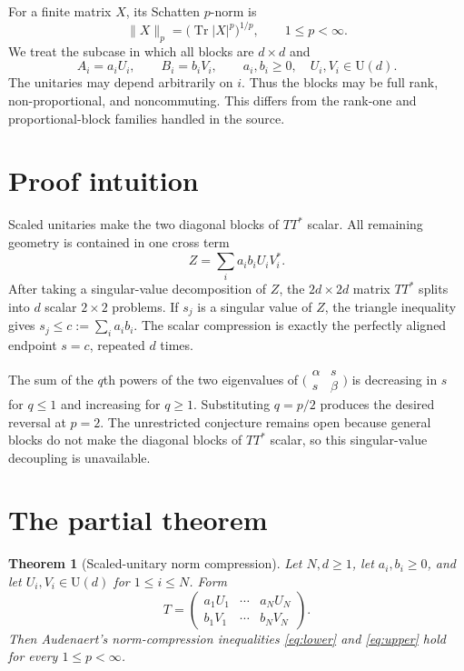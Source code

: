 \documentclass[11pt]{article}
\newtheorem{theorem}{Theorem}
\newcommand{\Tr}{\operatorname{Tr}}
\begin{document}
For a finite matrix $X$, its Schatten $p$-norm is
\[
 \lVert X\rVert_p=\bigl(\Tr |X|^p\bigr)^{1/p},\qquad 1\leq p<\infty.
\]
We treat the subcase in which all blocks are $d\times d$ and
\[
 A_i=a_iU_i,\qquad B_i=b_iV_i,
 \qquad a_i,b_i\geq0,\quad U_i,V_i\in\mathrm U(d).
\]
The unitaries may depend arbitrarily on $i$.  Thus the blocks may be full
rank, non-proportional, and noncommuting.  This differs from the rank-one and
proportional-block families handled in the source.

\section{Proof intuition}

Scaled unitaries make the two diagonal blocks of $TT^*$ scalar.  All remaining
geometry is contained in one cross term
\[
 Z=\sum_i a_ib_iU_iV_i^*.
\]
After taking a singular-value decomposition of $Z$, the $2d\times2d$ matrix
$TT^*$ splits into $d$ scalar $2\times2$ problems.  If $s_j$ is a singular
value of $Z$, the triangle inequality gives
$s_j\leq c:=\sum_i a_ib_i$.  The scalar compression is exactly the perfectly
aligned endpoint $s=c$, repeated $d$ times.

The sum of the $q$th powers of the two eigenvalues of
$\bigl(\begin{smallmatrix}\alpha&s\\s&\beta\end{smallmatrix}\bigr)$ is
decreasing in $s$ for $q\leq1$ and increasing for $q\geq1$.  Substituting
$q=p/2$ produces the desired reversal at $p=2$.  The unrestricted conjecture
remains open because general blocks do not make the diagonal blocks of $TT^*$
scalar, so this singular-value decoupling is unavailable.

\section{The partial theorem}

\begin{theorem}[Scaled-unitary norm compression]
\label{thm:main}
Let $N,d\geq1$, let $a_i,b_i\geq0$, and let $U_i,V_i\in\mathrm U(d)$ for
$1\leq i\leq N$.  Form
\[
 T=\begin{pmatrix}
 a_1U_1&\cdots&a_NU_N\\
 b_1V_1&\cdots&b_NV_N
 \end{pmatrix}.
\]
Then Audenaert's norm-compression inequalities \eqref{eq:lower} and
\eqref{eq:upper} hold for every $1\leq p<\infty$.
\end{theorem}
\end{document}
